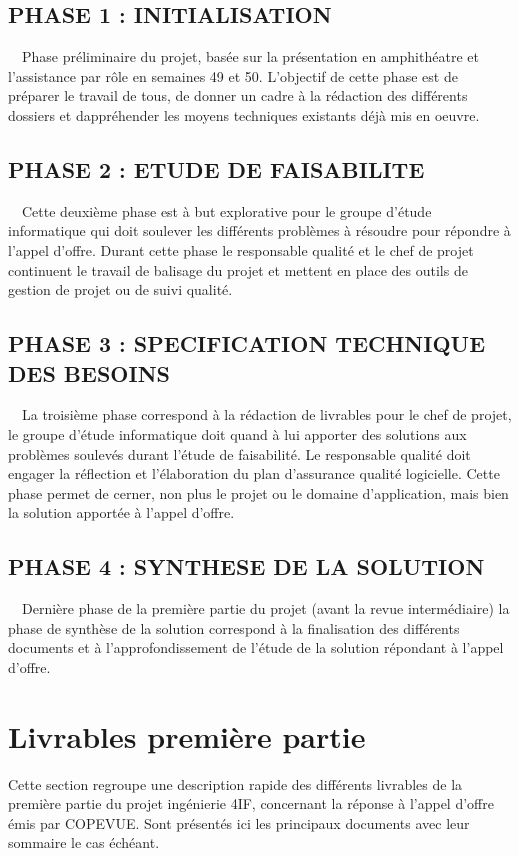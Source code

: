 \documentclass{mise_en_page}
\begin{document}
\subsection[PHASE 1 : INITIALISATION]{PHASE 1 : INITIALISATION}
\ \ Phase préliminaire du projet, basée sur la présentation en
amphithéatre et l’assistance par rôle en semaines 49 et 50. L’objectif
de cette phase est de préparer le travail de tous, de donner un cadre à
la rédaction des différents dossiers et d{\textquotesingle}appréhender
les moyens techniques existants déjà mis en oeuvre.

\subsection[PHASE 2 : ETUDE DE FAISABILITE]{PHASE 2 : ETUDE DE
FAISABILITE}
\ \ Cette deuxième phase est à but explorative pour le groupe d’étude
informatique qui doit soulever les différents problèmes à résoudre pour
répondre à l’appel d’offre. Durant cette phase le responsable qualité
et le chef de projet continuent le travail de balisage du projet et
mettent en place des outils de gestion de projet ou de suivi qualité.

\subsection[PHASE 3 : SPECIFICATION TECHNIQUE DES BESOINS]{PHASE 3 :
SPECIFICATION TECHNIQUE DES BESOINS}
\ \ La troisième phase correspond à la rédaction de livrables pour le
chef de projet, le groupe d’étude informatique doit quand à lui
apporter des solutions aux problèmes soulevés durant l’étude de
faisabilité. Le responsable qualité doit engager la réflection et
l’élaboration du plan d’assurance qualité logicielle. Cette phase
permet de cerner, non plus le projet ou le domaine d’application, mais
bien la solution apportée à l’appel d’offre.

\subsection[PHASE 4 : SYNTHESE DE LA SOLUTION]{PHASE 4 : SYNTHESE DE
LA SOLUTION}
\ \ Dernière phase de la première partie du projet (avant la revue
intermédiaire) la phase de synthèse de la solution correspond à la
finalisation des différents documents et à l’approfondissement de
l’étude de la solution répondant à l’appel d’offre.

\section[Livrables première partie]{Livrables première partie}
Cette section regroupe une description rapide des différents livrables
de la première partie du projet ingénierie 4IF, concernant la réponse à
l’appel d’offre émis par COPEVUE. Sont présentés ici les principaux
documents avec leur sommaire le cas échéant.
\end{document}
